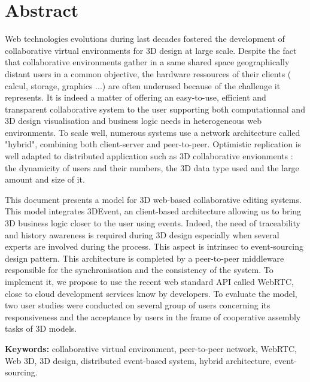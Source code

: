 {{\centering \section*{Abstract}}

Web technologies evolutions during last decades fostered the development of 
collaborative virtual environments for 3D design at large scale. Despite the fact 
that collaborative environments gather in a same shared space geographically 
distant users in a common objective, the hardware ressources of their clients (
calcul, storage, graphics ...) are often underused because of the challenge it 
represents. It is indeed a matter of offering an easy-to-use, efficient and 
transparent collaborative system to the user supporting both computationnal and 
3D 
design visualisation and business logic needs in heterogeneous web 
environments. 
To scale well, numerous systems use a network architecture called "hybrid",  
combining both client-server and peer-to-peer. Optimistic 
replication is well adapted to distributed application such as 3D collaborative 
envionments : the dynamicity of users and their numbers, the 3D data type 
used and the large amount and size of it.

This document presents a model for 3D web-based collaborative editing systems. 
This model integrates 3DEvent, an client-based architecture allowing us to bring 
3D business logic closer to the user using events. Indeed, the need of traceability 
and history awareness is required during 3D design especially when several 
experts are involved during the process. This aspect is intrinsec to event-sourcing 
design pattern. This architecture is completed by a peer-to-peer middleware 
responsible for the synchronisation and the consistency of the system. To 
implement it, we propose to use the recent web standard API called WebRTC, 
close to cloud development services know by developers. To evaluate the model, 
two user studies were conducted on several group of users concerning its 
responsiveness and the acceptance by users in the frame of cooperative 
assembly tasks of 3D models.



\textbf{Keywords:} collaborative virtual environment, peer-to-peer network, 
WebRTC, Web 3D, 3D design, distributed event-based system, hybrid 
architecture, event-sourcing.
}
